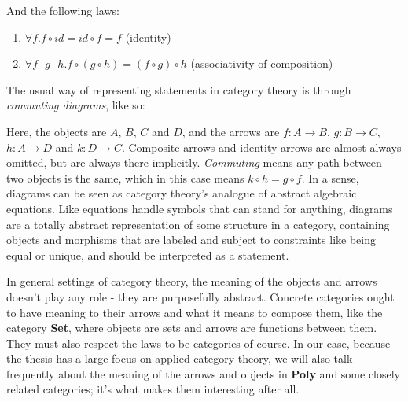 And the following laws:

\begin{enumerate}
  \item $ \forall f. f \circ id = id \circ f = f $ (identity)
  \item $ \forall f\text{ }g\text{ }h. f \circ (g \circ h) = (f \circ g) \circ h $ (associativity of composition)
\end{enumerate}

The usual way of representing statements in category theory is through \textit{commuting diagrams}, like so:


Here, the objects are $ A $, $ B $, $ C $ and $ D $, and the arrows are $ f : A \rightarrow B $, $ g : B \rightarrow C $, $ h : A \rightarrow D $ and $ k : D \rightarrow C $. Composite arrows and identity arrows are almost always omitted, but are always there implicitly. \textit{Commuting} means any path between two objects is the same, which in this case means  $ k \circ h = g \circ f $. In a sense, diagrams can be seen as category theory's analogue of abstract algebraic equations. Like equations handle symbols that can stand for anything, diagrams are a totally abstract representation of some structure in a category, containing objects and morphisms that are labeled and subject to constraints like being equal or unique, and should be interpreted as a statement.

In general settings of category theory, the meaning of the objects and arrows doesn't play any role - they are purposefully abstract. Concrete categories ought to have meaning to their arrows and what it means to compose them, like the category \textbf{Set}, where objects are sets and arrows are functions between them. They must also respect the laws to be categories of course. In our case, because the thesis has a large focus on applied category theory, we will also talk frequently about the meaning of the arrows and objects in \textbf{Poly} and some closely related categories; it's what makes them interesting after all.

